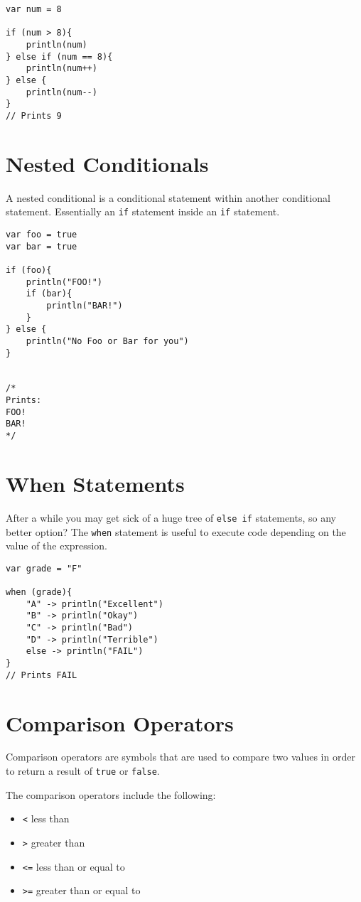 \begin{verbatim}
var num = 8 

if (num > 8){
    println(num)
} else if (num == 8){
    println(num++)
} else {
    println(num--)
}
// Prints 9
\end{verbatim}

\section{Nested Conditionals}
A nested conditional is a conditional statement within another conditional statement. Essentially an \verb!if! statement inside 
an \verb!if! statement. 

\begin{verbatim}
var foo = true 
var bar = true 

if (foo){
    println("FOO!")
    if (bar){
        println("BAR!")
    }
} else {
    println("No Foo or Bar for you")
}


/* 
Prints: 
FOO!
BAR!
*/
\end{verbatim}

\section{When Statements}
After a while you may get sick of a huge tree of \verb!else if! statements, so any better option? 
The \verb!when! statement is useful to execute code depending on the value of the expression. 

\begin{verbatim}
var grade = "F"

when (grade){
    "A" -> println("Excellent")
    "B" -> println("Okay")
    "C" -> println("Bad")
    "D" -> println("Terrible")
    else -> println("FAIL")
}
// Prints FAIL
\end{verbatim}

\section{Comparison Operators}
Comparison operators are symbols that are used to compare two 
values in order to return a result of \verb!true! or \verb!false!.

The comparison operators include the following: 
\begin{itemize}
    \item \verb!<! less than
    \item \verb!>! greater than
    \item \verb!<=! less than or equal to
    \item \verb!>=! greater than or equal to
\end{itemize}

